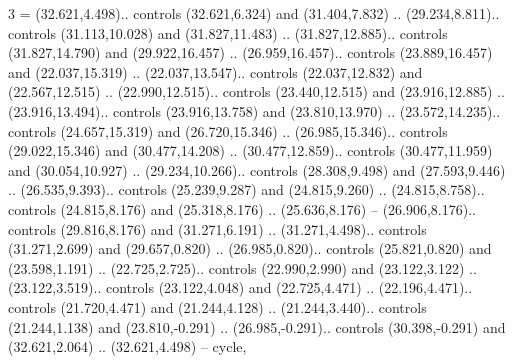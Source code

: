 {3} = {(32.621,4.498).. controls (32.621,6.324) and (31.404,7.832) .. (29.234,8.811).. controls (31.113,10.028) and (31.827,11.483) .. (31.827,12.885).. controls (31.827,14.790) and (29.922,16.457) .. (26.959,16.457).. controls (23.889,16.457) and (22.037,15.319) .. (22.037,13.547).. controls (22.037,12.832) and (22.567,12.515) .. (22.990,12.515).. controls (23.440,12.515) and (23.916,12.885) .. (23.916,13.494).. controls (23.916,13.758) and (23.810,13.970) .. (23.572,14.235).. controls (24.657,15.319) and (26.720,15.346) .. (26.985,15.346).. controls (29.022,15.346) and (30.477,14.208) .. (30.477,12.859).. controls (30.477,11.959) and (30.054,10.927) .. (29.234,10.266).. controls (28.308,9.498) and (27.593,9.446) .. (26.535,9.393).. controls (25.239,9.287) and (24.815,9.260) .. (24.815,8.758).. controls (24.815,8.176) and (25.318,8.176) .. (25.636,8.176) -- (26.906,8.176).. controls (29.816,8.176) and (31.271,6.191) .. (31.271,4.498).. controls (31.271,2.699) and (29.657,0.820) .. (26.985,0.820).. controls (25.821,0.820) and (23.598,1.191) .. (22.725,2.725).. controls (22.990,2.990) and (23.122,3.122) .. (23.122,3.519).. controls (23.122,4.048) and (22.725,4.471) .. (22.196,4.471).. controls (21.720,4.471) and (21.244,4.128) .. (21.244,3.440).. controls (21.244,1.138) and (23.810,-0.291) .. (26.985,-0.291).. controls (30.398,-0.291) and (32.621,2.064) .. (32.621,4.498) -- cycle},
